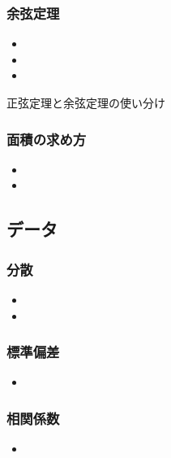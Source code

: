 \documentclass[10pt,dvipdfmx]{jsarticle}
\begin{document}
\subsubsection*{余弦定理}
\begin{LARGE}
  \begin{itemize}
    \item  \item  \item
  \end{itemize}
\end{LARGE}

\begin{itembox}[l]{正弦定理と余弦定理の使い分け}
  \vspace{8mm}
\end{itembox}


\subsubsection*{面積の求め方}
\begin{multicols}{2}
  \begin{LARGE}
    \begin{itemize}
      \item  \item
    \end{itemize}
  \end{LARGE}
\end{multicols}


\subsection*{データ}
\subsubsection*{分散}
\begin{LARGE}
  \begin{itemize}
    \item \item
  \end{itemize}
\end{LARGE}

\subsubsection*{標準偏差}
\begin{LARGE}
  \begin{itemize}
    \item
  \end{itemize}
\end{LARGE}

\subsubsection*{相関係数}
\begin{LARGE}
  \begin{itemize}
    \item
  \end{itemize}
\end{LARGE}
\end{document}
